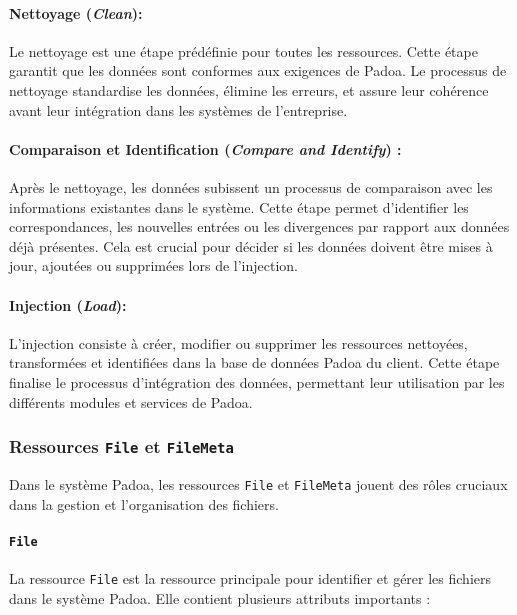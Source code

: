 \paragraph{Nettoyage (\emph{Clean}):}
Le nettoyage est une étape prédéfinie pour toutes les ressources. Cette étape garantit que les données sont conformes aux exigences de Padoa. Le processus de nettoyage standardise les données, élimine les erreurs, et assure leur cohérence avant leur intégration dans les systèmes de l'entreprise.

\paragraph{Comparaison et Identification (\emph{Compare and Identify}) :}
Après le nettoyage, les données subissent un processus de comparaison avec les informations existantes dans le système. Cette étape permet d'identifier les correspondances, les nouvelles entrées ou les divergences par rapport aux données déjà présentes. Cela est crucial pour décider si les données doivent être mises à jour, ajoutées ou supprimées lors de l'injection.

\paragraph{Injection (\emph{Load}):}
L'injection consiste à créer, modifier ou supprimer les ressources nettoyées, transformées et identifiées dans la base de données Padoa du client. Cette étape finalise le processus d'intégration des données, permettant leur utilisation par les différents modules et services de Padoa.


\subsubsection{Ressources \texttt{File} et \texttt{FileMeta}}

Dans le système Padoa, les ressources \texttt{File} et \texttt{FileMeta} jouent des rôles cruciaux dans la gestion et l'organisation des fichiers. 

\paragraph{\texttt{File}}

La ressource \texttt{File} est la ressource principale pour identifier et gérer les fichiers dans le système Padoa. Elle contient plusieurs attributs importants :

